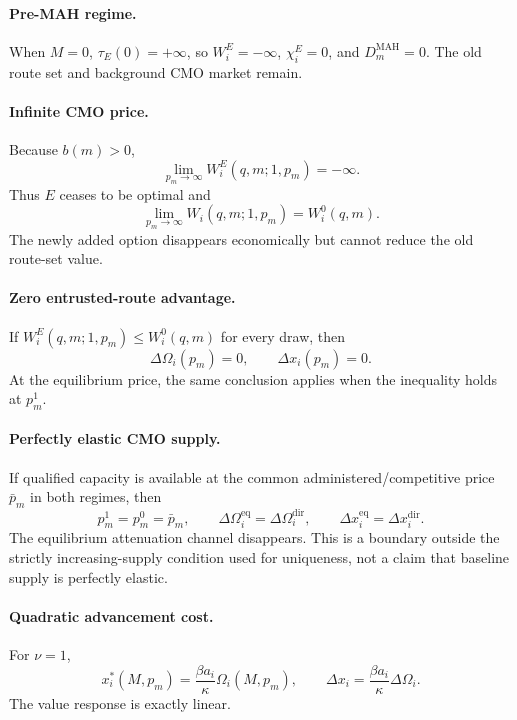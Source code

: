 \paragraph{Pre-MAH regime.}
When \(M=0\), \(\tau_E(0)=+\infty\), so \(W_i^E=-\infty\),
\(\chi_i^E=0\), and \(D_m^{\mathrm{MAH}}=0\). The old route set and background
CMO market remain.

\paragraph{Infinite CMO price.}
Because \(b(m)>0\),
\[
  \lim_{p_m\to\infty}W_i^E(q,m;1,p_m)=-\infty.
\]
Thus \(E\) ceases to be optimal and
\begin{equation}
  \lim_{p_m\to\infty}
  W_i(q,m;1,p_m)
  =
  W_i^0(q,m).
  \label{eq:p15-infinite-price-boundary}
\end{equation}
The newly added option disappears economically but cannot reduce the old
route-set value.

\paragraph{Zero entrusted-route advantage.}
If \(W_i^E(q,m;1,p_m)\leq W_i^0(q,m)\) for every draw, then
\begin{equation}
  \Delta\Omega_i(p_m)=0,
  \qquad
  \Delta x_i(p_m)=0.
  \label{eq:p15-zero-advantage-boundary}
\end{equation}
At the equilibrium price, the same conclusion applies when the inequality
holds at \(p_m^1\).

\paragraph{Perfectly elastic CMO supply.}
If qualified capacity is available at the common administered/competitive
price \(\bar p_m\) in both regimes, then
\[
  p_m^1=p_m^0=\bar p_m,
  \qquad
  \Delta\Omega_i^{\mathrm{eq}}=\Delta\Omega_i^{\mathrm{dir}},
  \qquad
  \Delta x_i^{\mathrm{eq}}=\Delta x_i^{\mathrm{dir}}.
\]
The equilibrium attenuation channel disappears. This is a boundary outside
the strictly increasing-supply condition used for uniqueness, not a claim
that baseline supply is perfectly elastic.

\paragraph{Quadratic advancement cost.}
For \(\nu=1\),
\begin{equation}
  x_i^*(M,p_m)
  =
  \frac{\beta a_i}{\kappa}\Omega_i(M,p_m),
  \qquad
  \Delta x_i
  =
  \frac{\beta a_i}{\kappa}\Delta\Omega_i.
  \label{eq:p15-quadratic-boundary}
\end{equation}
The value response is exactly linear.

